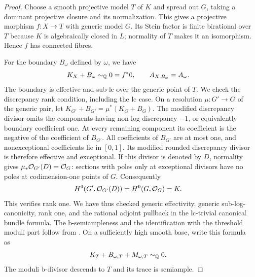 \begin{proof}
Choose a smooth projective model $T$ of $K$ and spread out $G$,
taking a dominant projective closure and its normalization.
This gives a projective morphism $f:X\to T$ with generic model
$G$.  Its Stein factor is finite birational over $T$ because $K$
is algebraically closed in $L$; normality of $T$ makes it an
isomorphism.  Hence $f$ has connected fibres.

For the boundary $B_\omega$ defined by $\omega$, we have
\[
 K_X+B_\omega\sim_{\mathbb Q}0=f^*0,
 \qquad A_{X,B_\omega}=A_\omega.
\]
The boundary is effective and sub-lc over the generic point of
$T$.  We check the discrepancy rank condition, including the lc
case.  On a resolution $\mu:G'\to G$ of the generic pair, let
$K_{G'}+B_{G'}=\mu^*(K_G+B_G)$.  The modified discrepancy
divisor omits the components having non-log discrepancy $-1$,
or equivalently boundary coefficient one.  At every remaining
component its coefficient is the negative of the coefficient of
$B_{G'}$.  All coefficients of $B_{G'}$ are at most one, and
nonexceptional coefficients lie in $[0,1]$.  Its modified rounded
discrepancy divisor is therefore effective and exceptional.
If this divisor is denoted by $D$, normality gives
$\mu_*\mathcal O_{G'}(D)=\mathcal O_G$: sections with poles only at exceptional
divisors have no poles at codimension-one points of $G$.
Consequently
\[
 H^0(G',\mathcal O_{G'}(D))=H^0(G,\mathcal O_G)=K.
\]
This verifies rank one.  We have thus checked generic effectivity,
generic sub-log-canonicity, rank one, and the rational adjoint
pullback in the lc-trivial canonical bundle formula.
The b-semiampleness and the identification with the threshold
moduli part follow from \cite[Theorems~1.5 and~6.28]{BFMT}.
On a sufficiently high smooth base, write this formula as
\begin{equation}
\label{tower:cbf}
 K_T+B_{\omega,T}+M_{\omega,T}\sim_{\mathbb Q}0.
\end{equation}
The moduli b-divisor descends to $T$ and its trace is semiample.


\end{proof}
